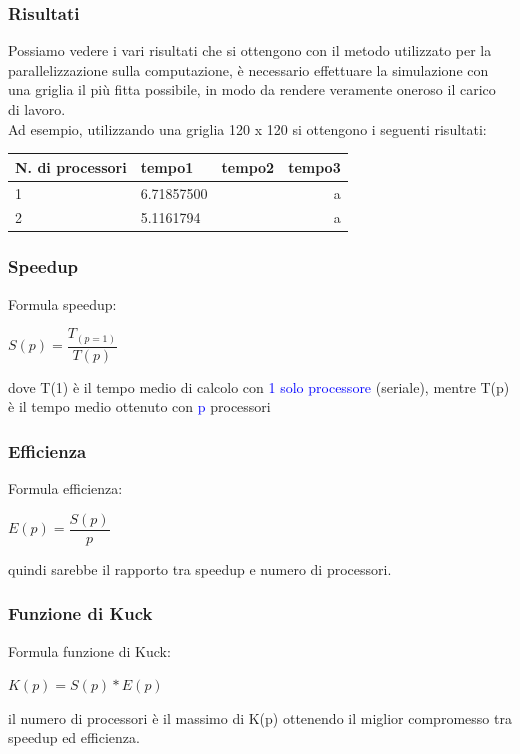 \documentclass{beamer}
\begin{document}
\begin{frame}
	\frametitle{Risultati}
	Possiamo vedere i vari risultati che si ottengono con il metodo utilizzato per la parallelizzazione sulla computazione, è necessario effettuare la simulazione con una griglia il più fitta possibile, in modo da rendere veramente oneroso il carico di lavoro.\\
	
	Ad esempio, utilizzando una griglia 120 x 120 si ottengono i seguenti risultati:
	
	\smallskip
	\begin{center}
		\begin{tabular}{|l|l|l|r|}
			\hline
			N. di processori & tempo1 & tempo2 & tempo3\\
			\hline
			1 & 6.71857500 &  & a\\
			\hline
			2 & 5.1161794 & & a\\
			\hline
		
		\end{tabular}
	
	\end{center}
	
\end{frame}



\begin{frame}
	\frametitle{Speedup}
	Formula speedup:
	
	\begin{center}
		$ S(p) = \dfrac{T_{(p=1)}}{T(p)} $
	\end{center}
		dove T(1) è il tempo medio di calcolo con \textcolor{blue}{1 solo processore} (seriale), mentre T(p) è il tempo medio ottenuto con \textcolor{blue}{p} processori
	
\end{frame}

\begin{frame}
	\frametitle{Efficienza}
	Formula efficienza:
	
	\begin{center}
		$ E(p) = \dfrac{S(p)}{p} $
	\end{center}
quindi sarebbe il rapporto tra speedup e numero di processori.

	
\end{frame}

\begin{frame}
	\frametitle{Funzione di Kuck}
	Formula funzione di Kuck:
	
	\begin{center}
		$ K(p) = S(p)* E(p) $
	\end{center}
	il numero di processori è il massimo di K(p) ottenendo il miglior compromesso tra speedup ed efficienza.  
	
	
\end{frame}
\end{document}
